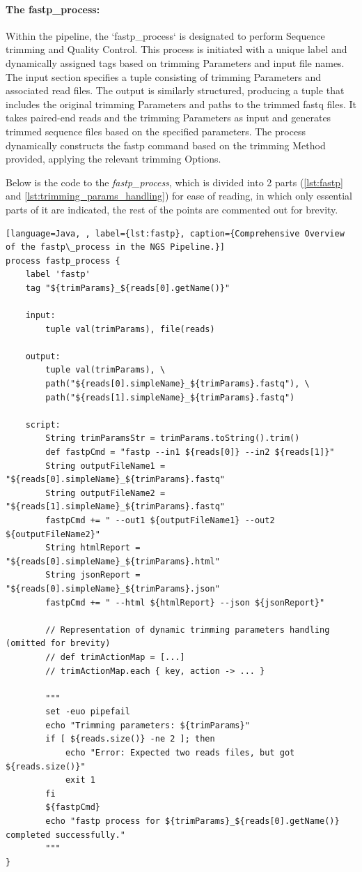 \paragraph{The fastp\_process:}

Within the pipeline, the `fastp\_process` is designated to perform Sequence \gls{trimming} and Quality Control. This process is initiated with a unique label and dynamically assigned tags based on \gls{trimming} Parameters and input file names. The input section specifies a tuple consisting of \gls{trimming} Parameters and associated \gls{read} files. The output is similarly structured, producing a tuple that includes the original \gls{trimming} Parameters and paths to the trimmed \gls{fastq} files. It takes \gls{paired-end} \gls{read}s and the \gls{trimming} Parameters as input and generates trimmed sequence files based on the specified parameters. The process dynamically constructs the fastp command based on the \gls{trimming} Method provided, applying the relevant \gls{trimming} Options.

Below is the code to the \textit{fastp\_process}, which is divided into 2 parts (\autoref{lst:fastp} and \autoref{lst:trimming_params_handling}) for ease of reading, in which only essential parts of it are indicated, the rest of the points are commented out for brevity.


\begin{lstlisting}[language=Java, , label={lst:fastp}, caption={Comprehensive Overview of the fastp\_process in the NGS Pipeline.}]
process fastp_process {
    label 'fastp'
    tag "${trimParams}_${reads[0].getName()}"

    input:
        tuple val(trimParams), file(reads)

    output:
        tuple val(trimParams), \
        path("${reads[0].simpleName}_${trimParams}.fastq"), \
        path("${reads[1].simpleName}_${trimParams}.fastq")

    script:
        String trimParamsStr = trimParams.toString().trim()
        def fastpCmd = "fastp --in1 ${reads[0]} --in2 ${reads[1]}"
        String outputFileName1 = "${reads[0].simpleName}_${trimParams}.fastq"
        String outputFileName2 = "${reads[1].simpleName}_${trimParams}.fastq"
        fastpCmd += " --out1 ${outputFileName1} --out2 ${outputFileName2}"
        String htmlReport = "${reads[0].simpleName}_${trimParams}.html"
        String jsonReport = "${reads[0].simpleName}_${trimParams}.json"
        fastpCmd += " --html ${htmlReport} --json ${jsonReport}"

        // Representation of dynamic trimming parameters handling (omitted for brevity)
        // def trimActionMap = [...]
        // trimActionMap.each { key, action -> ... }

        """
        set -euo pipefail
        echo "Trimming parameters: ${trimParams}"
        if [ ${reads.size()} -ne 2 ]; then
            echo "Error: Expected two reads files, but got ${reads.size()}"
            exit 1
        fi
        ${fastpCmd}
        echo "fastp process for ${trimParams}_${reads[0].getName()} completed successfully."
        """
}
\end{lstlisting}


